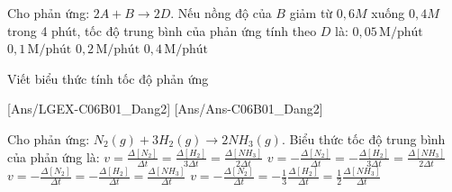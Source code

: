 \documentclass[Main.tex]{subfiles}
\begin{document}
	\begin{ex}
		Cho phản ứng: $2A + B \rightarrow 2D$. Nếu nồng độ của $B$ giảm từ $0{,}6 M$ xuống $0{,}4 M$ trong 4 phút, tốc độ trung bình của phản ứng tính theo $D$ là:
		\choice
		{$0{,}05 \, \text{M/phút}$}
		{\True $0{,}1 \, \text{M/phút}$}
		{$0{,}2 \, \text{M/phút}$}
		{$0{,}4 \, \text{M/phút}$}
	\end{ex}
	\Closesolutionfile{ans}
	\Closesolutionfile{ansex}
	
%	
%	
\begin{dang}{Viết biểu thức tính tốc độ phản ứng}
\end{dang}
[Ans/LGEX-C06B01_Dang2]
[Ans/Ans-C06B01_Dang2]
	\begin{ex}
		Cho phản ứng: $N_2(g) + 3H_2(g) \rightarrow 2NH_3(g)$. Biểu thức tốc độ trung bình của phản ứng là:
		\choice
		{$v = \frac{\Delta [N_2]}{\Delta t} = \frac{\Delta [H_2]}{3\Delta t} = \frac{\Delta [NH_3]}{2\Delta t}$}
		{$v = -\frac{\Delta [N_2]}{\Delta t} = -\frac{\Delta [H_2]}{3\Delta t} = \frac{\Delta [NH_3]}{2\Delta t}$}
		{$v = -\frac{\Delta [N_2]}{\Delta t} = -\frac{\Delta [H_2]}{\Delta t} = \frac{\Delta [NH_3]}{\Delta t}$}
		{\True $v = -\frac{\Delta [N_2]}{\Delta t} = -\frac{1}{3}\frac{\Delta [H_2]}{\Delta t} = \frac{1}{2}\frac{\Delta [NH_3]}{\Delta t}$}
	\end{ex}
	
\end{document}
